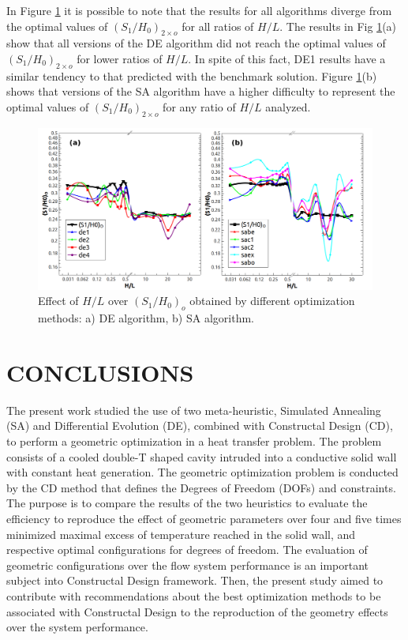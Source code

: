 \documentclass[12pt,fleqn]{article}
\begin{document}
In Figure \ref{figure08} it is possible to note that the results for all algorithms diverge from the optimal values of ${(S_{1}/H_{0})_{2\times o}}$ for all ratios of $H/L$. The results in Fig \ref{figure08}(a) show that all versions of the DE algorithm did not reach the optimal values of ${(S_{1}/H_{0})_{2\times o}}$ for lower ratios of  $H/L$. In spite of this fact, DE1 results have a similar tendency to that predicted with the benchmark solution. Figure \ref{figure08}(b) shows that versions of the SA algorithm have a higher difficulty to represent the optimal values of ${(S_{1}/H_{0})_{2\times o}}$ for any ratio of  $H/L$ analyzed.
\begin{figure}[H]
\centering
\includegraphics[width=1\linewidth]{imgs/5dof/de_sa_hl_s1h0.png}
\caption{ {\small Effect of $H/L$ over ${(S_{1}/H_{0})_{o}}$ obtained by different optimization methods: a) DE algorithm, b) SA algorithm.}}
\label{figure08}
\end{figure}

\section{CONCLUSIONS}

The present work studied the use of two meta-heuristic, Simulated Annealing (SA) and Differential Evolution (DE), combined with Constructal Design (CD), to perform a geometric optimization in a heat transfer problem. The problem consists of a cooled double-T shaped cavity intruded into a conductive solid wall with constant heat generation. The geometric optimization problem is conducted by the CD method that defines the Degrees of Freedom (DOFs) and constraints. The purpose is to compare the results of the two heuristics to evaluate the efficiency to reproduce the effect of geometric parameters over four and five times minimized maximal excess of temperature reached in the solid wall, and respective optimal configurations for degrees of freedom. The evaluation of geometric configurations over the flow system performance is an important subject into Constructal Design framework. Then, the present study aimed to contribute with recommendations about the best optimization methods to be associated with Constructal Design to the reproduction of the geometry effects over the system performance.
\end{document}
